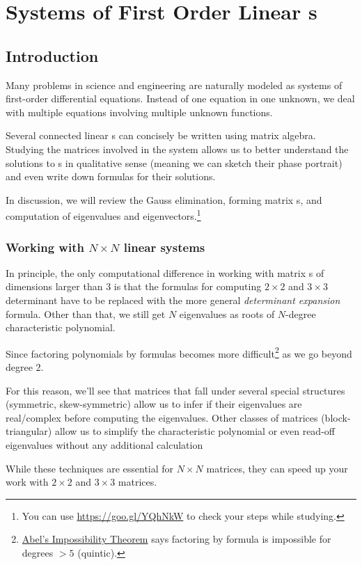 \newpage
\chapter{Systems of First Order Linear \ode{}s}
  \section{Introduction}
    Many problems in science and engineering are naturally modeled as systems of first-order differential equations.
    Instead of one equation in one unknown, we deal with multiple equations involving multiple unknown functions.  

    \begin{weekintro}
    Several connected linear \ode{}s can concisely be written using matrix algebra. Studying the matrices involved in the system allows us to better understand the solutions to \ode{}s in qualitative sense (meaning we can sketch their phase portrait) and even write down formulas for their solutions.

    In discussion, we will review the Gauss elimination, forming matrix \ode{}s, and computation of eigenvalues and eigenvectors.\footnote{You can use \url{https://goo.gl/YQhNkW} to check your steps while studying.}
    \end{weekintro}

    \subsection{Working with \(N \times N\) linear systems}

      \begin{weekintro}
        In principle, the only computational difference in working with matrix \ode{}s of dimensions larger than 3 is that the formulas for 
        computing \(2 \times 2\) and \(3 \times 3\) determinant have to be replaced with the more general \emph{determinant expansion} formula.
        Other than that, we still get \(N\) eigenvalues as roots of \(N\)-degree characteristic polynomial.
        
        Since factoring polynomials by formulas becomes more difficult\footnote{\href{https://goo.gl/iAd3XQ}{Abel's Impossibility Theorem} says
        factoring by formula is impossible for degrees \(> 5\) (quintic).} as we go beyond degree 2.

        For this reason, we'll see that matrices that fall under several special structures (symmetric, skew-symmetric) allow us to infer
        if their eigenvalues are real/complex before computing the eigenvalues.  Other classes of matrices (block-triangular) allow us to
        simplify the characteristic polynomial or even read-off eigenvalues without any additional calculation
        
        While these techniques are essential for \(N \times N\) matrices, they can speed up your work with \(2\times 2\) and \(3 \times 3\) matrices.
      \end{weekintro}


